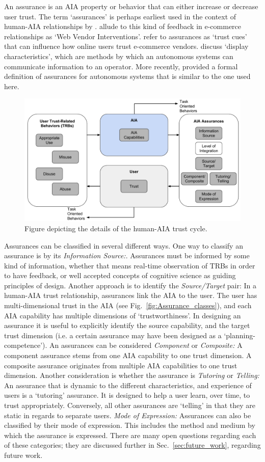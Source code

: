 An assurance is an AIA property or behavior that can either increase or decrease user trust. The term `assurances' is perhaps earliest used in the context of human-AIA relationships by \citet{Sheridan1984-kx}. \citet{McKnight2001-fa} allude to this kind of feedback in e-commerce relationships as `Web Vendor Interventions'. \citet{Corritore2003-gx} refer to assurances as `trust cues' that can influence how online users trust e-commerce vendors. \citet{Lee2004-pv} discuss `display characteristics', which are methods by which an autonomous systems can communicate information to an operator. More recently, \citet{Lillard2015-yg} provided a formal definition of assurances for autonomous systems that is similar to the one used here. 

\begin{figure}[t]%
    \centering
    \includegraphics[width=0.6\linewidth]{Figures/RefinedTrust_one_way.pdf}
    \caption{Figure depicting the details of the human-AIA trust cycle.}
    \label{fig:refined_trust}
\end{figure}

Assurances can be classified in several different ways. One way to classify an assurance is by its \emph{Information Source:}. Assurances must be informed by some kind of information, whether that means real-time observation of TRBs in order to have feedback, or well accepted concepts of cognitive science as guiding principles of design.
Another approach is to identify the \emph{Source/Target} pair: In a human-AIA trust relationship, assurances link the AIA to the user. The user has multi-dimensional trust in the AIA (see Fig.~\ref{fig:Assurance_classes}), and each AIA capability has multiple dimensions of `trustworthiness'. In designing an assurance it is useful to explicitly identify the source capability, and the target trust dimension (i.e. a certain assurance may have been designed as a `planning-competence').
An assurances can be considered \emph{Component} or \emph{Composite:} A component assurance stems from one AIA capability to one trust dimension. A composite assurance originates from multiple AIA capabilities to one trust dimension.
Another consideration is whether the assurance is \emph{Tutoring} or \emph{Telling:} An assurance that is dynamic to the different characteristics, and experience of users is a `tutoring' assurance. It is designed to help a user learn, over time, to trust appropriately. Conversely, all other assurances are `telling' in that they are static in regards to separate users.
\emph{Mode of Expression:} Assurances can also be classified by their mode of expression. This includes the method and medium by which the assurance is expressed.
There are many open questions regarding each of these categories; they are discussed further in Sec.~\ref{sec:future_work}, regarding future work.

